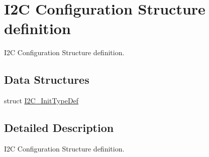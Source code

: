 \hypertarget{group___i2_c___configuration___structure__definition}{}\section{I2C Configuration Structure definition}
\label{group___i2_c___configuration___structure__definition}


I2C Configuration Structure definition.  


\subsection*{Data Structures}
\begin{DoxyCompactItemize}
\item 
struct \hyperlink{struct_i2_c___init_type_def}{I2\+C\+\_\+\+Init\+Type\+Def}
\end{DoxyCompactItemize}


\subsection{Detailed Description}
I2C Configuration Structure definition. 

